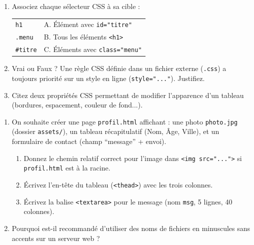 \documentclass[11pt]{article}
\begin{document}
\begin{exercice}
\begin{enumerate}
    \item Associez chaque sélecteur CSS à sa cible :
\begin{tabular}{ll}
    \texttt{h1}          & A. Élément avec \texttt{id="titre"} \\
    \texttt{.menu}       & B. Tous les éléments \texttt{<h1>} \\
    \texttt{\#titre}     & C. Éléments avec \texttt{class="menu"} \\
    \end{tabular}
    \item Vrai ou Faux ? Une règle CSS définie dans un fichier externe (\texttt{.css}) a toujours priorité sur un style en ligne (\texttt{style="..."}). Justifiez.
    \item Citez deux propriétés CSS permettant de modifier l'apparence d'un tableau (bordures, espacement, couleur de fond...).
\end{enumerate}
\end{exercice}

\begin{exercice}
\begin{enumerate}
    \item On souhaite créer une page \texttt{profil.html} affichant : une photo \texttt{photo.jpg} (dossier \texttt{assets/}), un tableau récapitulatif (Nom, Âge, Ville), et un formulaire de contact (champ ``message'' + envoi). 
    \begin{enumerate}
        \item Donnez le chemin relatif correct pour l'image dans \texttt{<img src="...">} si \texttt{profil.html} est à la racine.
        \item Écrivez l'en-tête du tableau (\texttt{<thead>}) avec les trois colonnes.
        \item Écrivez la balise \texttt{<textarea>} pour le message (nom \texttt{msg}, 5 lignes, 40 colonnes).
    \end{enumerate}
    \item Pourquoi est-il recommandé d'utiliser des noms de fichiers en minuscules sans accents sur un serveur web ?
\end{enumerate}
\end{exercice}
\end{document}
